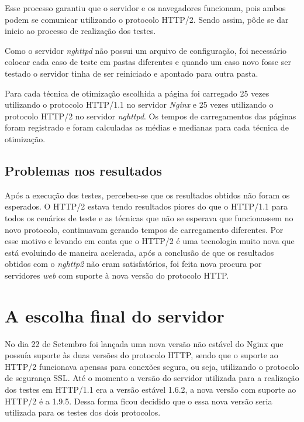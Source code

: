 Esse processo garantiu que o servidor e os navegadores funcionam, pois ambos podem se comunicar utilizando o protocolo HTTP/2. Sendo assim, pôde se dar inicio ao processo de realização dos testes.

Como o servidor \textit{nghttpd} não possui um arquivo de configuração, foi necessário colocar cada caso de teste em pastas diferentes e quando um caso novo fosse ser testado o servidor tinha de ser reiniciado e apontado para outra pasta.

Para cada técnica de otimização escolhida a página foi carregado 25 vezes utilizando o protocolo HTTP/1.1 no servidor \textit{Nginx} e 25 vezes utilizando o protocolo HTTP/2 no servidor \textit{nghttpd}. Os tempos de carregamentos das páginas foram registrado e foram calculadas as médias e medianas para cada técnica de otimização.

\subsection{Problemas nos resultados}
\label{problemasnosresultados}

Após a execução dos testes, percebeu-se que os resultados obtidos não foram os esperados. O HTTP/2 estava tendo resultados piores do que o HTTP/1.1 para todos os cenários de teste e as técnicas que não se esperava que funcionassem no novo protocolo, continuavam gerando tempos de carregamento diferentes. Por esse motivo e levando em conta que o HTTP/2 é uma tecnologia muito nova que está evoluindo de maneira acelerada, após a conclusão de que os resultados obtidos com o \textit{nghttp2} não eram satisfatórios, foi feita nova procura por servidores \textit{web} com suporte à nova versão do protocolo HTTP.

\section{A escolha final do servidor}
\label{aescolhafinaldoservidor}


No dia 22 de Setembro foi lançada uma nova versão não estável do Nginx que possuía suporte às duas versões do protocolo HTTP, sendo que o suporte ao HTTP/2 funcionava apensas para conexões segura, ou seja, utilizando o protocolo de segurança SSL. Até o momento a versão do servidor utilizada para a realização dos testes em HTTP/1.1 era a versão estável 1.6.2, a nova versão com suporte ao HTTP/2 é a 1.9.5. Dessa forma ficou decidido que o essa nova versão seria utilizada para os testes dos dois protocolos.

